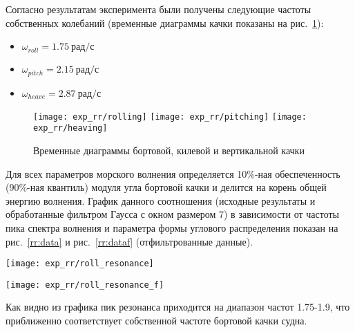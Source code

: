 Согласно результатам эксперимента были получены следующие частоты собственных колебаний (временные диаграммы качки показаны на рис.~\ref{exp_rr_rolling}):
\begin{itemize}
	\item	$ \omega_{roll} = 1.75\ \text{рад/с}$
	\item	$ \omega_{pitch} = 2.15\ \text{рад/с}$
	\item	$ \omega_{heave} = 2.87\ \text{рад/с}$
\end{itemize}

\begin{figure}[ht]
	\begin{center}
	\texttt{[image: exp\_rr/rolling]}
	\texttt{[image: exp\_rr/pitching]}
	\texttt{[image: exp\_rr/heaving]}
	\end{center}
	\caption{Временные диаграммы бортовой, килевой и вертикальной качки}
	\label{exp_rr_rolling}
\end{figure}

Для всех параметров морского волнения определяется 10\%-ная обеспеченность (90\%-ная квантиль) модуля угла бортовой качки и делится на корень общей энергию волнения. График данного соотношения (исходные результаты и обработанные фильтром Гаусса с окном размером 7) в зависимости от частоты пика спектра волнения и параметра формы углового распределения показан на рис.~\ref{rr:data} и рис.~\ref{rr:dataf} (отфильтрованные данные).

\begin{sidewaysfigure}
	\texttt{[image: exp\_rr/roll\_resonance]}
	\caption{График соотношения 10\%-ной обеспеченность модуля угла бортовой качки к энергии волнения.}
	\label{rr:data}
\end{sidewaysfigure}

\begin{sidewaysfigure}
	\texttt{[image: exp\_rr/roll\_resonance\_f]}
	\caption{График обработанных фильтром Гаусса (размер ядра --- 7) данных соотношения 10\%-ной обеспеченность модуля угла бортовой качки к энергии волнения..}
	\label{rr:dataf}
\end{sidewaysfigure}


Как видно из графика пик резонанса приходится на диапазон частот 1.75-1.9, что приближенно соответствует собственной частоте бортовой качки судна.